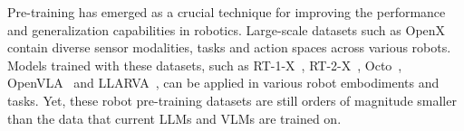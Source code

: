 



 Pre-training has emerged as a crucial technique for improving the performance and generalization capabilities in robotics. Large-scale datasets such as OpenX~\cite{open_x_embodiment_rt_x_2023} contain diverse sensor modalities, tasks and action spaces across various robots. Models trained with these datasets, such as RT-1-X~\cite{brohan_rt-1_2023}, RT-2-X~\cite{brohan_rt-2_2023}, Octo~\cite{team2024octo}, OpenVLA~\cite{kimOpenVLAOpenSourceVisionLanguageAction2024} and LLARVA~\cite{niuLLARVAVisionActionInstruction2024}, can be applied in various robot embodiments and tasks. Yet, these robot pre-training datasets are still orders of magnitude smaller than the data that current LLMs and VLMs are trained on.



